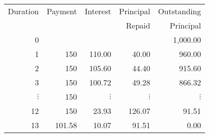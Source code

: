 \documentclass[../00_main.tex]{subfiles}
\begin{document}
\begin{center}
\begin{tabular}{|r|r|r|r|r|}\hline
    Duration & Payment & Interest & Principal & Outstanding 
    \\ &&& Repaid & Principal \\\hline\hline
    0  &     &        &        & 1,000.00 \\
    1  & 150 & 110.00 &  40.00 &  960.00  \\
    2  & 150 & 105.60 &  44.40 &  915.60  \\
    3  & 150 & 100.72 &  49.28 &  866.32  \\
    $\vdots$  & 150    & $\vdots$ & $\vdots$ & $\vdots$ \\
    12 & 150 & 23.93  &  126.07 &  91.51  \\
    13 & 101.58 & 10.07 &  91.51 &  0.00  \\\hline
\end{tabular}
\end{center}
\end{document}
